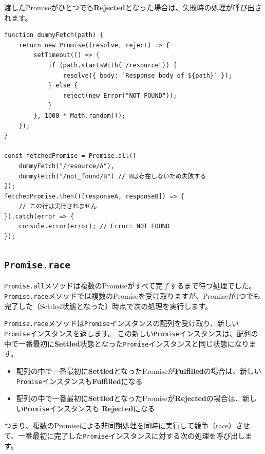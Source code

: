 渡したPromiseがひとつでも\textbf{Rejected}となった場合は、失敗時の処理が呼び出されます。

\enlargethispage{\baselineskip}\begin{lstlisting}
function dummyFetch(path) {
    return new Promise((resolve, reject) => {
        setTimeout(() => {
            if (path.startsWith("/resource")) {
                resolve({ body: `Response body of ${path}` });
            } else {
                reject(new Error("NOT FOUND"));
            }
        }, 1000 * Math.random());
    });
}

const fetchedPromise = Promise.all([
    dummyFetch("/resource/A"),
    dummyFetch("/not_found/B") // Bは存在しないため失敗する
]);
fetchedPromise.then(([responseA, responseB]) => {
    // この行は実行されません
}).catch(error => {
    console.error(error); // Error: NOT FOUND
});
\end{lstlisting}

\hypertarget{promise-race}{%
\subsection{\texorpdfstring{\texttt{Promise.race}}{Promise.race}}\label{promise-race}}

\texttt{Promise.all}メソッドは複数のPromiseがすべて完了するまで待つ処理でした。
\texttt{Promise.race}メソッドでは複数のPromiseを受け取りますが、Promiseが1つでも完了した（Settled状態となった）時点で次の処理を実行します。

\texttt{Promise.race}メソッドは\texttt{Promise}インスタンスの配列を受け取り、新しい\texttt{Promise}インスタンスを返します。
この新しい\texttt{Promise}インスタンスは、配列の中で一番最初に\textbf{Settled}状態となった\texttt{Promise}インスタンスと同じ状態になります。

\begin{itemize}
\item
  配列の中で一番最初に\textbf{Settled}となったPromiseが\textbf{Fulfilled}の場合は、新しい\texttt{Promise}インスタンスも\textbf{Fulfilled}になる
\item
  配列の中で一番最初に\textbf{Settled}となったPromiseが\textbf{Rejected}の場合は、新しい\texttt{Promise}インスタンスも
  \textbf{Rejected}になる
\end{itemize}

つまり、複数のPromiseによる非同期処理を同時に実行して競争（race）させて、一番最初に完了した\texttt{Promise}インスタンスに対する次の処理を呼び出します。

